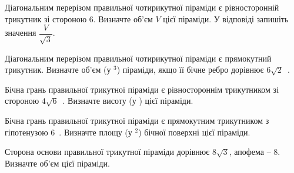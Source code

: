 \documentclass[12pt]{article}
\begin{document}

\begin{samepage}
\noindent\zadnum Діагональним перерізом правильної чотирикутної піраміди є рівносторонній трикутник зі стороною 6. Визначте об’єм $V$ цієї піраміди. У відповіді запишіть значення $\dfrac{V}{\sqrt{3}}$. 

\nmtnobreak
\nopagebreak\nbvspace{0.5cm}
\nmtAnswerBox
\par{}
\end{samepage}

\begin{samepage}
\noindent\zadnum Діагональним перерізом правильної чотирикутної піраміди є прямокутний трикутник. Визначте об’єм (у $^3$) піраміди, якщо її бічне ребро дорівнює $6\sqrt{2}$~. 

\nmtnobreak
\nopagebreak\nbvspace{0.5cm}
\nmtAnswerBox
\par{}
\end{samepage}

\begin{samepage}
\noindent\zadnum Бічна грань правильної трикутної піраміди є рівностороннім трикутником зі стороною $4\sqrt{6}$~. Визначте висоту (у ) цієї піраміди. 

\nmtnobreak
\nopagebreak\nbvspace{0.5cm}
\nmtAnswerBox
\par{}
\end{samepage}

\begin{samepage}
\noindent\zadnum Бічна грань правильної трикутної піраміди є прямокутним трикутником з гіпотенузою 6~. Визначте площу (у $^2$) бічної поверхні цієї піраміди. 

\nmtnobreak
\nopagebreak\nbvspace{0.5cm}
\nmtAnswerBox
\par{}
\end{samepage}

\begin{samepage}
\noindent\zadnum Сторона основи правильної трикутної піраміди дорівнює $8\sqrt{3}$, апофема – 8. Визначте об’єм цієї піраміди. 

\nmtnobreak
\nopagebreak\nbvspace{0.5cm}
\nmtAnswerBox
\par{}
\end{samepage}
\end{document}
